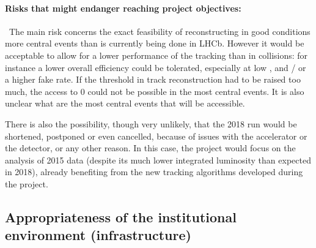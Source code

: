 \documentclass[a4paper,11pt]{article}
\newcommand{\supervisor}{the supervisor}
\begin{document}
\paragraph{Risks that might endanger reaching project objectives: }\
The main risk concerns the exact feasibility of reconstructing in good conditions more central events than is currently being done in LHCb. However it would be acceptable to allow for a lower performance of the tracking than in \pp collisions: for instance a lower overall efficiency could be tolerated, especially at low \pt, and / or a higher fake rate. If the \pt threshold in track reconstruction had to be raised too much, the access to 0 \pt \Dz could not be possible in the most central events. It is also unclear what are the most central events that will be accessible. 

There is also the possibility, though very unlikely, that the 2018 \pbpb run would be shortened, postponed or even cancelled, because of issues with the accelerator or the detector, or any other reason. In this case, the project would focus on the analysis of 2015 \pbpb data (despite its much lower integrated luminosity than expected in 2018), already benefiting from the new tracking algorithms developed during the project.

%      
%      
\subsection{Appropriateness of the institutional environment (infrastructure)}


\end{document}
